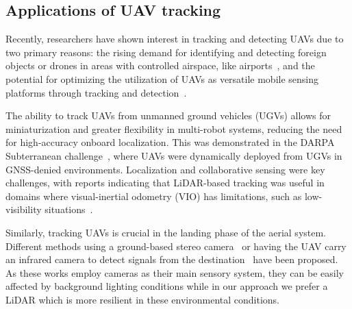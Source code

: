 \subsection{Applications of UAV tracking}

Recently, researchers have shown interest in tracking and detecting UAVs due to two primary reasons: the rising demand for identifying and detecting foreign objects or drones in areas with controlled airspace, like airports~\cite{guvenc2018detection, hengy2017multimodal}, and the potential for optimizing the utilization of UAVs as versatile mobile sensing platforms through tracking and detection~\cite{queralta2020autosos}.

The ability to track UAVs from unmanned ground vehicles (UGVs) allows for miniaturization and greater flexibility in multi-robot systems, reducing the need for high-accuracy onboard localization. This was demonstrated in the DARPA Subterranean challenge~\cite{rouvcek2019darpa, petrlik2020robust}, where UAVs were dynamically deployed from UGVs in GNSS-denied environments. Localization and collaborative sensing were key challenges, with reports indicating that LiDAR-based tracking was useful in domains where visual-inertial odometry (VIO) has limitations, such as low-visibility situations~\cite{queralta2020vio, qingqing2019offloading}.

Similarly, tracking UAVs is crucial in the landing phase of the aerial system. Different methods using a ground-based stereo camera~\cite{kong2013uavstereolanding} or having the UAV carry an infrared camera to detect signals from the destination~\cite{gui2013uavinfraredlanding} have been proposed. As these works employ cameras as their main sensory system, they can be easily affected by background lighting conditions while in our approach we prefer a LiDAR which is more resilient in these environmental conditions.
